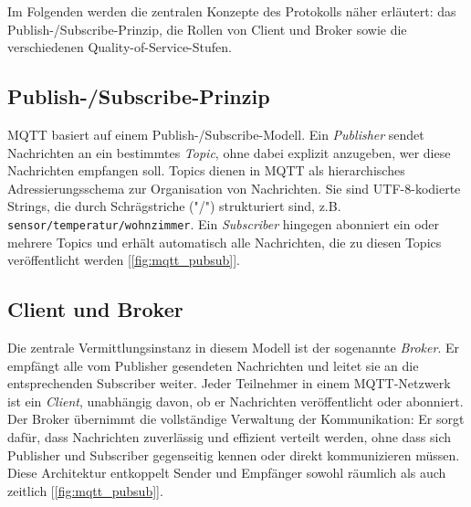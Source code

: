Im Folgenden werden die zentralen Konzepte des Protokolls näher erläutert: das Publish-/Subscribe-Prinzip, die Rollen von Client und Broker sowie die verschiedenen Quality-of-Service-Stufen.

\subsection*{Publish-/Subscribe-Prinzip}

MQTT basiert auf einem Publish-/Subscribe-Modell. Ein \emph{Publisher} sendet Nachrichten an ein bestimmtes \emph{Topic}, ohne dabei explizit anzugeben, wer diese Nachrichten empfangen soll. Topics dienen in MQTT als hierarchisches Adressierungsschema zur Organisation von Nachrichten. Sie sind UTF-8-kodierte Strings, die durch Schrägstriche ("/") strukturiert sind, z.B. \texttt{sensor/temperatur/wohnzimmer}. Ein \emph{Subscriber} hingegen abonniert ein oder mehrere Topics und erhält automatisch alle Nachrichten, die zu diesen Topics veröffentlicht werden [\autoref{fig:mqtt_pubsub}].

\subsection*{Client und Broker}

Die zentrale Vermittlungsinstanz in diesem Modell ist der sogenannte \emph{Broker}. Er empfängt alle vom Publisher gesendeten Nachrichten und leitet sie an die entsprechenden Subscriber weiter. Jeder Teilnehmer in einem MQTT-Netzwerk ist ein \emph{Client}, unabhängig davon, ob er Nachrichten veröffentlicht oder abonniert. Der Broker übernimmt die vollständige Verwaltung der Kommunikation: Er sorgt dafür, dass Nachrichten zuverlässig und effizient verteilt werden, ohne dass sich Publisher und Subscriber gegenseitig kennen oder direkt kommunizieren müssen. Diese Architektur entkoppelt Sender und Empfänger sowohl räumlich als auch zeitlich \cite[Abschnitt 4.7]{oasis_mqtt_spec} [\autoref{fig:mqtt_pubsub}].

